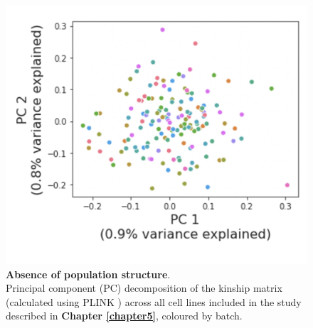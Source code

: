 \begin{figure}[h]
    \centering
    \includegraphics[width=14cm]{Appendix2/Fig/suppl_pop_struct_pc.png}
    \caption[Absence of population structure]{\textbf{Absence of population structure}.\\
    Principal component (PC) decomposition of the kinship matrix (calculated using PLINK \cite{purcell2007plink}) across all cell lines included in the study described in \textbf{Chapter \ref{chapter5}}, coloured by batch.}
    \label{suppl_fig:no_pop_struct}
\end{figure}

